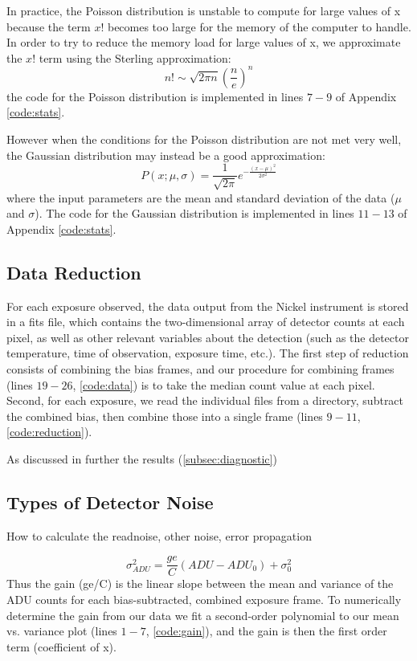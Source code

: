 \documentclass[preprint]{aastex62}
\begin{document}
In practice, the Poisson distribution is unstable to compute for large values of x because the term $x!$ becomes too large for the memory of the computer to handle. In order to try to reduce the memory load for large values of x, we approximate the $x!$ term using the Sterling approximation:
\begin{equation}
n! \sim \sqrt{2\pi n}\left(\frac{n}{e} \right)^n
\end{equation}
the code for the Poisson distribution is implemented in lines $7-9$ of Appendix \ref{code:stats}.

However when the conditions for the Poisson distribution are not met very well, the Gaussian distribution may instead be a good approximation:
\begin{equation}
P(x; \mu, \sigma) = \frac{1}{\sqrt{2\pi}} e^{-\frac{(x-\mu)^2}{2\sigma^2}}
\end{equation}
where the input parameters are the mean and standard deviation of the data ($\mu$ and $\sigma$). The code for the Gaussian distribution is implemented in lines $11-13$ of Appendix \ref{code:stats}. 

\subsection{Data Reduction} \label{sec:reduction}
For each exposure observed, the data output from the Nickel instrument is stored in a fits file, which contains the two-dimensional array of detector counts at each pixel, as well as other relevant variables about the detection (such as the detector temperature, time of observation, exposure time, etc.). The first step of reduction consists of combining the bias frames, and our procedure for combining frames (lines $19-26$, \ref{code:data}) is to take the median count value at each pixel. Second, for each exposure, we read the individual files from a directory, subtract the combined bias, then combine those into a single frame (lines $9-11$, \ref{code:reduction}).

As discussed in further the results (\ref{subsec:diagnostic})

\subsection{Types of Detector Noise} \label{subsec:noise}
How to calculate the readnoise, other noise, error propagation

\begin{equation}
\sigma_{ADU}^2 = \frac{ge}{C} \left(ADU - ADU_0 \right) + \sigma_0^2
\end{equation}
Thus the gain (ge/C) is the linear slope between the mean and variance of the ADU counts for each bias-subtracted, combined exposure frame. To numerically determine the gain from our data we fit a second-order polynomial to our mean vs. variance plot (lines $1-7$, \ref{code:gain}), and the gain is then the first order term (coefficient of x).
\end{document}
